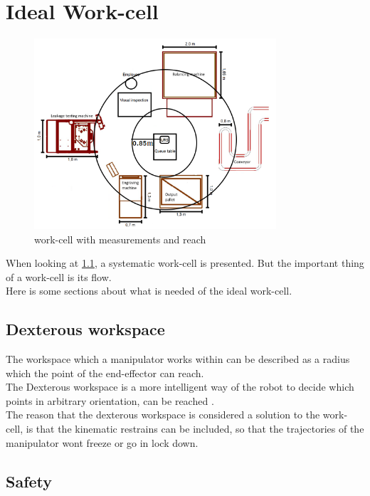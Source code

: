\chapter{Ideal Work-cell}\label{IdealWorkCell}

\begin{figure}[h]
    \centering
    \includegraphics[width=9cm]{Design/Work_cell_3.png}
    \caption{work-cell with measurements and reach}
    \label{fig:workcellMR}
\end{figure}

When looking at \ref{fig:workcellMR}, a systematic work-cell is presented. But the important thing of a work-cell is its flow.\\
Here is some sections about what is needed of the ideal work-cell.

\section{Dexterous workspace}

The workspace which a manipulator works within can be described as a radius which the point of the end-effector can reach.\\
The Dexterous workspace is a more intelligent way of the robot to decide which points in arbitrary orientation, can be reached \cite{Dexterous}.\\
The reason that the dexterous workspace is considered a solution to the work-cell, is that the kinematic restrains can be included, so that the trajectories of the manipulator wont freeze or go in lock down.\\


\section{Safety}

